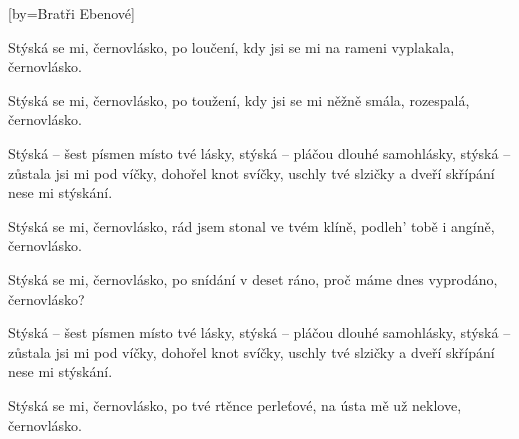 [by={Bratři Ebenové}]

\beginverse{}
Stýská se mi, černovlásko,
po loučení, kdy jsi se mi
na rameni vyplakala, černovlásko.  
\endverse{}

\beginverse{}
Stýská se mi, černovlásko,
po toužení, kdy jsi se mi
něžně smála, rozespalá, černovlásko.  
\endverse{}

\beginchorus{}
Stýská -- šest písmen místo tvé lásky,
stýská -- pláčou dlouhé samohlásky,
stýská -- zůstala jsi mi pod víčky,
dohořel knot svíčky, uschly tvé slzičky
a dveří skřípání nese mi stýskání.
\endchorus{}

\beginverse{}
Stýská se mi, černovlásko,
rád jsem stonal ve tvém klíně,
podleh' tobě i angíně, černovlásko.  
\endverse{}

\beginverse{}
Stýská se mi, černovlásko,
po snídání v deset ráno,
proč máme dnes vyprodáno, černovlásko?  
\endverse{}

\repeatingchorus{}
\beginchorus{}
Stýská -- šest písmen místo tvé lásky,
stýská -- pláčou dlouhé samohlásky,
stýská -- zůstala jsi mi pod víčky,
dohořel knot svíčky, uschly tvé slzičky
a dveří skřípání nese mi stýskání.
\endchorus{}

\beginverse{}
Stýská se mi, černovlásko,
po tvé rtěnce perleťové,
na ústa mě už neklove, černovlásko.  
\endverse{}


